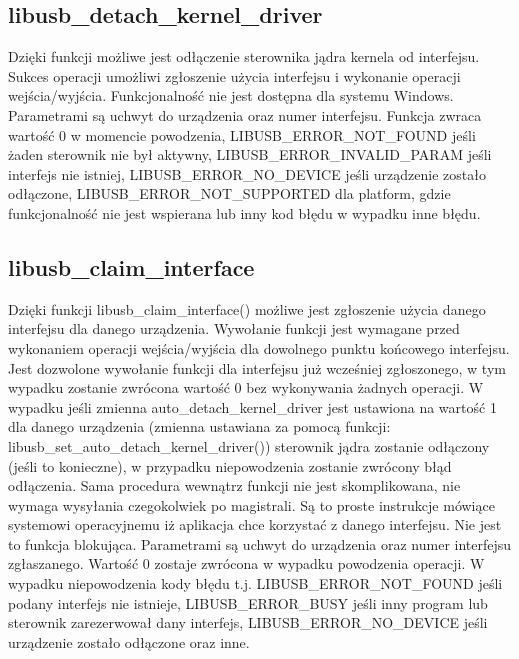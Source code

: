 \documentclass{BscUS}
\begin{document}
\subsection{libusb\_detach\_kernel\_driver}
Dzięki funkcji możliwe jest odłączenie sterownika jądra kernela od interfejsu.
\newline
Sukces operacji umożliwi zgłoszenie użycia interfejsu i wykonanie operacji wejścia/wyjścia.
\newline
Funkcjonalność nie jest dostępna dla systemu Windows.
\newline
Parametrami są uchwyt do urządzenia oraz numer interfejsu.
\newline
Funkcja zwraca wartość 0 w momencie powodzenia, LIBUSB\_ERROR\_NOT\_FOUND jeśli żaden sterownik nie był aktywny, LIBUSB\_ERROR\_INVALID\_PARAM jeśli interfejs nie istniej, LIBUSB\_ERROR\_NO\_DEVICE jeśli urządzenie zostało odłączone, LIBUSB\_ERROR\_NOT\_SUPPORTED dla platform, gdzie funkcjonalność nie jest wspierana lub inny kod błędu w wypadku inne błędu.
\subsection{libusb\_claim\_interface}
Dzięki funkcji libusb\_claim\_interface() możliwe jest zgłoszenie użycia danego interfejsu dla danego urządzenia.
\newline
Wywołanie funkcji jest wymagane przed wykonaniem operacji wejścia/wyjścia dla dowolnego punktu końcowego interfejsu.
\newline
Jest dozwolone wywołanie funkcji dla interfejsu już wcześniej zgłoszonego, w tym wypadku zostanie zwrócona wartość 0 bez wykonywania żadnych operacji.
\newline
W wypadku jeśli zmienna auto\_detach\_kernel\_driver jest ustawiona na wartość 1 dla danego urządzenia (zmienna ustawiana za pomocą funkcji: libusb\_set\_auto\_detach\_kernel\_driver()) sterownik jądra zostanie odłączony (jeśli to konieczne), w przypadku niepowodzenia zostanie zwrócony błąd odłączenia.
\newline
Sama procedura wewnątrz funkcji nie jest skomplikowana, nie wymaga wysyłania czegokolwiek po magistrali. Są to proste instrukcje mówiące systemowi operacyjnemu iż aplikacja chce korzystać z danego interfejsu.
\newline
Nie jest to funkcja blokująca.
\newline
Parametrami są uchwyt do urządzenia oraz numer interfejsu zgłaszanego.
\newline
Wartość 0 zostaje zwrócona w wypadku powodzenia operacji.
\newline
W wypadku niepowodzenia kody błędu t.j. LIBUSB\_ERROR\_NOT\_FOUND jeśli podany interfejs nie istnieje, LIBUSB\_ERROR\_BUSY jeśli inny program lub sterownik zarezerwował dany interfejs, LIBUSB\_ERROR\_NO\_DEVICE jeśli urządzenie zostało odłączone oraz inne.
\end{document}
